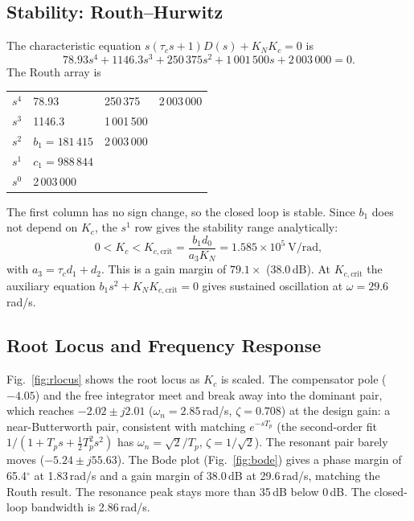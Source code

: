 \documentclass[conference]{IEEEtran}
\newcommand{\Tp}{T_p}
\begin{document}
\subsection{Stability: Routh--Hurwitz}
The characteristic equation $s(\tau_cs+1)D(s)+K_NK_c=0$ is
\begin{equation}
78.93s^4+1146.3s^3+250\,375s^2+1\,001\,500s+2\,003\,000=0.
\end{equation}
The Routh array \cite{ogata} is
\begin{center}\footnotesize
\begin{tabular}{l|lll}
$s^4$ & 78.93 & 250\,375 & 2\,003\,000\\
$s^3$ & 1146.3 & 1\,001\,500 & \\
$s^2$ & $b_1=181\,415$ & 2\,003\,000 & \\
$s^1$ & $c_1=988\,844$ & & \\
$s^0$ & 2\,003\,000 & &
\end{tabular}
\end{center}
The first column has no sign change, so the closed loop is stable. Since $b_1$
does not depend on $K_c$, the $s^1$ row gives the stability range analytically:
\begin{equation}
0<K_c<K_{c,\mathrm{crit}}=\frac{b_1d_0}{a_3K_N}=1.585\times10^5\ \mathrm{V/rad},
\end{equation}
with $a_3=\tau_cd_1+d_2$. This is a gain margin of $79.1\times$ (38.0\,dB). At
$K_{c,\mathrm{crit}}$ the auxiliary equation $b_1s^2+K_NK_{c,\mathrm{crit}}=0$
gives sustained oscillation at $\omega=29.6$\,rad/s.

\subsection{Root Locus and Frequency Response}
Fig.~\ref{fig:rlocus} shows the root locus \cite{franklin} as $K_c$ is scaled. The
compensator pole ($-4.05$) and the free integrator meet and break away into the
dominant pair, which reaches $-2.02\pm j2.01$ ($\omega_n=2.85$\,rad/s,
$\zeta=0.708$) at the design gain: a near-Butterworth pair, consistent with
matching $e^{-s\Tp}$ (the second-order fit $1/(1+\Tp s+\tfrac12\Tp^2s^2)$ has
$\omega_n=\sqrt2/\Tp$, $\zeta=1/\sqrt2$). The resonant pair barely moves
($-5.24\pm j55.63$). The Bode plot (Fig.~\ref{fig:bode}) gives a phase
margin of 65.4$^\circ$ at 1.83\,rad/s and a gain margin of 38.0\,dB at
29.6\,rad/s, matching the Routh result. The resonance peak stays more than
35\,dB below 0\,dB. The closed-loop bandwidth is 2.86\,rad/s.
\end{document}
